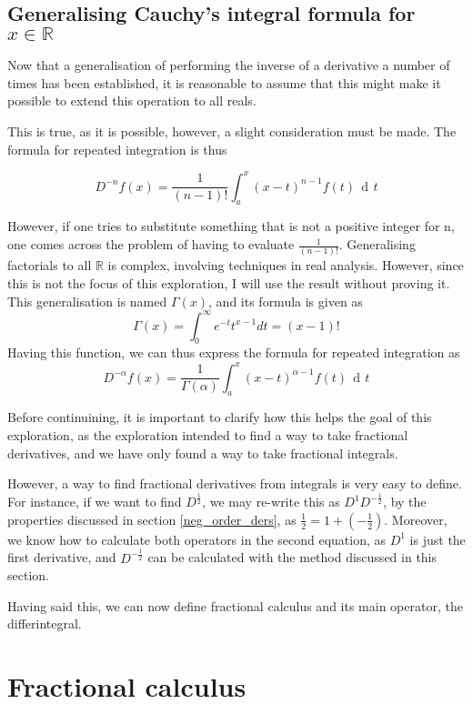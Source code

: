 \documentclass{article}
\DeclareMathOperator{\di}{\,d\!}
\begin{document}
\subsection{Generalising Cauchy's integral formula for \texorpdfstring{$x \in \mathbb{R}$}{x in R}}

Now that a generalisation of performing the inverse of a derivative a number of
times has been established, it is reasonable to assume that this might make it
possible to extend this operation to all reals.

This is true, as it is possible, however, a slight consideration must be made.
The formula for repeated integration is thus

$$
D^{-n}f(x) = \frac{1}{(n-1)!}\int_a^{x}\left(x-t\right)^{n-1}f(t)\di t
$$

However, if one tries to substitute something that is not a positive integer
for n, one comes across the problem of having to evaluate
$\frac{1}{(n-1)!}$. Generalising factorials to all $\mathbb{R}$ is complex,
involving techniques in real analysis. However, since this is not the focus of
this exploration, I will use the result without proving it. This generalisation
is named $\Gamma(x)$, and its formula is given as
$$
\Gamma(x)=\int_0^{\infty} e^{-t}t^{x-1}dt = (x-1)!
$$
Having this function, we can thus express the formula for repeated integration as
$$
D^{-\alpha}f(x) = \frac{1}{\Gamma\left(\alpha\right)}\int_a^{x}\left(x-t\right)^{\alpha-1} f(t)\di t
$$

Before continuining, it is important to clarify how this helps the goal of this
exploration, as the exploration intended to find a way to take fractional
derivatives, and we have only found a way to take fractional integrals.

However, a way to find fractional derivatives from integrals is very easy to
define. For instance, if we want to find $D^\frac{1}{2}$, we may re-write this
as $D^1D^{-\frac{1}{2}}$, by the properties discussed in section
\ref{neg_order_ders}, as $\frac{1}{2}=1+\left(-\frac{1}{2}\right)$. Moreover,
we know how to calculate both operators in the second equation, as $D^1$ is
just the first derivative, and $D^{-\frac{1}{2}}$ can be calculated with the
method discussed in this section.

Having said this, we can now define fractional calculus and its main operator,
the differintegral.


\section{Fractional calculus}
\end{document}
